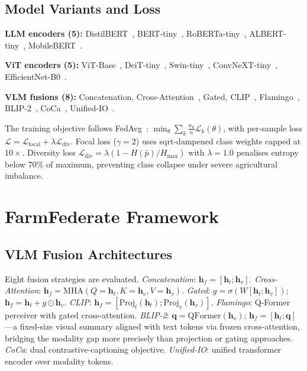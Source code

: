 \documentclass[conference]{IEEEtran}
\begin{document}
\subsection{Model Variants and Loss}

\textbf{LLM encoders (5):} DistilBERT~\cite{Sanh2019},
BERT-tiny~\cite{Devlin2019}, RoBERTa-tiny~\cite{Liu2019roberta},
ALBERT-tiny~\cite{Lan2020}, MobileBERT~\cite{Sun2020}.

\textbf{ViT encoders (5):} ViT-Base~\cite{Dosovitskiy2021},
DeiT-tiny~\cite{Touvron2021}, Swin-tiny~\cite{Liu2021swin},
ConvNeXT-tiny~\cite{Liu2022convnext}, EfficientNet-B0~\cite{Tan2019}.

\textbf{VLM fusions (8):} Concatenation, Cross-Attention~\cite{Vaswani2017},
Gated, CLIP~\cite{Radford2021}, Flamingo~\cite{Alayrac2022},
BLIP-2~\cite{Li2023blip}, CoCa~\cite{Yu2022}, Unified-IO~\cite{Lu2022}.

The training objective follows FedAvg~\cite{McMahan2017}:
$\min_\theta\sum_k\frac{n_k}{n}\mathcal{L}_k(\theta)$, with per-sample
loss $\mathcal{L}{=}\mathcal{L}_{\mathrm{focal}}{+}\lambda\mathcal{L}_{\mathrm{div}}$.
Focal loss ($\gamma{=}2$) uses sqrt-dampened class weights capped at
$10{\times}$. Diversity loss
$\mathcal{L}_{\mathrm{div}}{=}\lambda(1{-}H(\bar{p})/H_{\max})$
with $\lambda{=}1.0$ penalises entropy below 70\% of maximum, preventing
class collapse under severe agricultural imbalance.

\section{FarmFederate Framework}

\subsection{VLM Fusion Architectures}

Eight fusion strategies are evaluated. \textit{Concatenation}:
$\mathbf{h}_f{=}[\mathbf{h}_t;\mathbf{h}_v]$. \textit{Cross-Attention}:
$\mathbf{h}_f{=}\mathrm{MHA}(Q{=}\mathbf{h}_t,K{=}\mathbf{h}_v,V{=}\mathbf{h}_v)$.
\textit{Gated}: $g{=}\sigma(W[\mathbf{h}_t;\mathbf{h}_v])$;
$\mathbf{h}_f{=}\mathbf{h}_t{+}g\!\odot\!\mathbf{h}_v$.
\textit{CLIP}: $\mathbf{h}_f{=}[\mathrm{Proj}_t(\mathbf{h}_t);\mathrm{Proj}_v(\mathbf{h}_v)]$.
\textit{Flamingo}: Q-Former perceiver with gated cross-attention.
\textit{BLIP-2}: $\mathbf{q}{=}\mathrm{QFormer}(\mathbf{h}_v)$;
$\mathbf{h}_f{=}[\mathbf{h}_t;\mathbf{q}]$---a fixed-size visual summary
aligned with text tokens via frozen cross-attention, bridging the modality
gap more precisely than projection or gating approaches.
\textit{CoCa}: dual contrastive-captioning objective.
\textit{Unified-IO}: unified transformer encoder over modality tokens.
\end{document}
